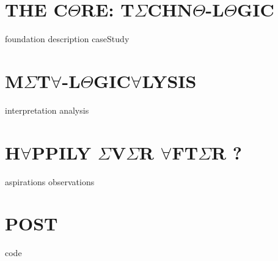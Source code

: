 \documentclass{thesis} %
\begin{document}
\part{\texorpdfstring{THE C$\Theta$RE: T$\Sigma$CHN$\Theta$-L$\Theta$GIC}{THE CORE: TECHNO-LOGIC}}
{foundation}
{description}
{caseStudy}

\part{\texorpdfstring{M$\Sigma$T$\forall$-L$\Theta$GIC$\forall$LYSIS}{META-LOGICALYSIS}}
{interpretation}
{analysis}

\part{\texorpdfstring{H$\forall$PPILY $\Sigma$V$\Sigma$R $\forall$FT$\Sigma$R ?}{HAPPILY EVER AFTER ?}}
{aspirations}
{observations}

\appendix

\part*{\texorpdfstring{POST\frownie{}}{POSTFACE}}
{code}
\clearpage

\pagestyle{plain}
{}
\clearpage

{}
\printnoidxglossary
\clearpage
\end{document}
